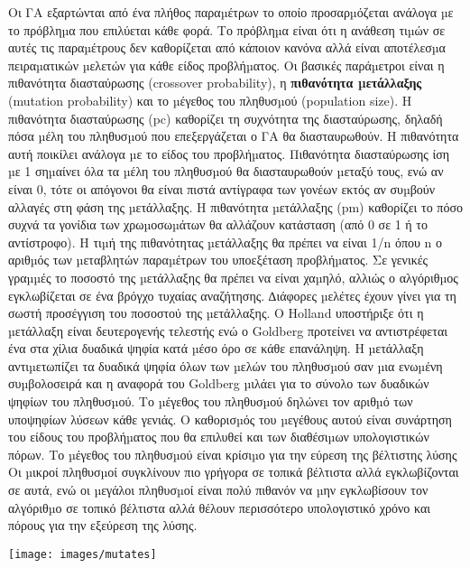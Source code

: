 Οι ΓΑ εξαρτώνται από ένα πλήθος παραµέτρων το οποίο προσαρµόζεται ανάλογα µε το πρόβληµα που επιλύεται κάθε φορά. Το πρόβληµα είναι ότι η ανάθεση τιµών σε αυτές τις παραµέτρους δεν καθορίζεται από κάποιον κανόνα αλλά είναι αποτέλεσµα πειραµατικών µελετών για κάθε είδος προβλήµατος. Οι βασικές παράµετροι είναι η πιθανότητα διασταύρωσης (crossover probability), η \label{muta} \textbf{πιθανότητα µετάλλαξης} (mutation probability) και το µέγεθος του πληθυσµού (population size). Η πιθανότητα διασταύρωσης (pc) καθορίζει τη συχνότητα της διασταύρωσης, δηλαδή πόσα µέλη του πληθυσµού που επεξεργάζεται ο ΓΑ θα διασταυρωθούν. Η πιθανότητα αυτή ποικίλει ανάλογα µε το είδος του προβλήµατος. Πιθανότητα διασταύρωσης ίση µε 1 σηµαίνει όλα τα µέλη του πληθυσµού θα διασταυρωθούν µεταξύ τους, ενώ αν είναι 0, τότε οι απόγονοι θα είναι πιστά αντίγραφα των γονέων εκτός αν συµβούν αλλαγές στη φάση της µετάλλαξης. Η πιθανότητα µετάλλαξης (pm) καθορίζει το πόσο συχνά τα γονίδια των χρωµοσωµάτων θα αλλάζουν κατάσταση (από 0 σε 1 ή το αντίστροφο). Η τιµή της πιθανότητας µετάλλαξης θα πρέπει να είναι 1/n όπου n ο αριθµός των µεταβλητών παραµέτρων του υποεξέταση προβλήµατος. Σε γενικές γραµµές το ποσοστό της µετάλλαξης θα πρέπει να είναι χαµηλό, αλλιώς ο αλγόριθµος εγκλωβίζεται σε ένα βρόγχο τυχαίας αναζήτησης.
∆ιάφορες µελέτες έχουν γίνει για τη σωστή προσέγγιση του ποσοστού της µετάλλαξης. Ο Holland υποστήριξε ότι η µετάλλαξη είναι δευτερογενής τελεστής ενώ ο Goldberg προτείνει να αντιστρέφεται ένα στα χίλια δυαδικά ψηφία κατά µέσο όρο σε κάθε επανάληψη. Η µετάλλαξη αντιµετωπίζει τα δυαδικά ψηφία όλων των µελών του πληθυσµού σαν µια ενωµένη συµβολοσειρά και η αναφορά του Goldberg µιλάει για το σύνολο των δυαδικών ψηφίων του πληθυσµού. Το µέγεθος του πληθυσµού δηλώνει τον αριθµό των υποψηφίων λύσεων κάθε γενιάς. Ο καθορισµός του µεγέθους αυτού είναι συνάρτηση του είδους του προβλήµατος που θα επιλυθεί και των διαθέσιµων υπολογιστικών πόρων. Το µέγεθος του πληθυσµού είναι κρίσιµο για την εύρεση της βέλτιστης λύσης Οι µικροί πληθυσµοί συγκλίνουν πιο γρήγορα σε τοπικά βέλτιστα αλλά εγκλωβίζονται σε αυτά, ενώ οι µεγάλοι πληθυσµοί είναι πολύ πιθανόν να µην εγκλωβίσουν τον αλγόριθµο σε τοπικό βέλτιστα αλλά θέλουν περισσότερο υπολογιστικό χρόνο και πόρους για την εξεύρεση της λύσης.

\noindent\begin{minipage}{\linewidth}
\centering
{}
\texttt{[image: images/mutates]}
\label{fig:Mutates}
\end{minipage}


